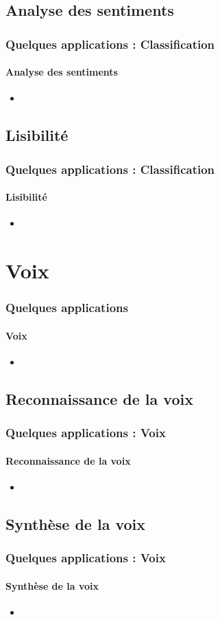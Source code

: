 \documentclass[xcolor=table]{beamer}
\begin{document}
\subsection{Analyse des sentiments}

\begin{frame}
	\frametitle{Quelques applications : Classification}
	\framesubtitle{Analyse des sentiments}
	\begin{itemize}
		\item 
	\end{itemize}
\end{frame}

\subsection{Lisibilité}

\begin{frame}
	\frametitle{Quelques applications : Classification}
	\framesubtitle{Lisibilité}
	\begin{itemize}
		\item 
	\end{itemize}
\end{frame}


\section{Voix}

\begin{frame}
	\frametitle{Quelques applications}
	\framesubtitle{Voix}
	\begin{itemize}
		\item 
	\end{itemize}
\end{frame}

\subsection{Reconnaissance de la voix}

\begin{frame}
	\frametitle{Quelques applications : Voix}
	\framesubtitle{Reconnaissance de la voix}
	\begin{itemize}
		\item 
	\end{itemize}
\end{frame}

\subsection{Synthèse de la voix}

\begin{frame}
	\frametitle{Quelques applications : Voix}
	\framesubtitle{Synthèse de la voix}
	\begin{itemize}
		\item 
	\end{itemize}
\end{frame}


\end{document}
